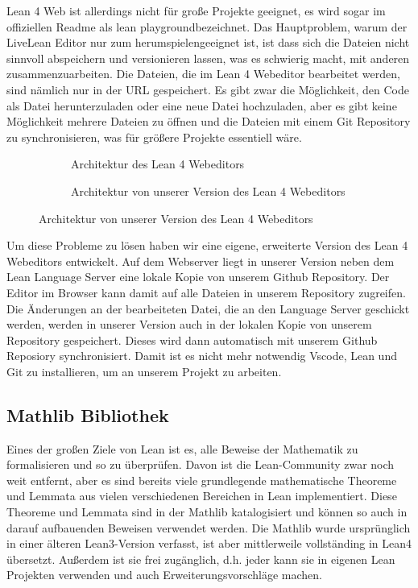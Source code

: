 \documentclass[10pt]{article}
\begin{document}
\noindent Lean 4 Web ist allerdings nicht für große Projekte geeignet, es wird sogar im offiziellen Readme als \glqq lean playground\grqq \space bezeichnet. Das Hauptproblem, warum der LiveLean Editor nur zum  \glqq herumspielen\grqq \space geeignet ist, ist dass sich die Dateien nicht sinnvoll abspeichern und versionieren lassen, was es schwierig macht, mit anderen zusammenzuarbeiten. Die Dateien, die im Lean 4 Webeditor bearbeitet werden, sind nämlich nur in der URL gespeichert. Es gibt zwar die Möglichkeit, den Code als Datei herunterzuladen oder eine neue Datei hochzuladen, aber es gibt keine Möglichkeit mehrere Dateien zu öffnen und die Dateien mit einem Git Repository zu synchronisieren, was für größere Projekte essentiell wäre. 
\begin{figure}[H]
\centering
    
\begin{subfigure}{.4\textwidth}
      \centering
    
    \caption{Architektur des Lean 4 Webeditors}
    \label{Architektur des Lean 4 Webeditors}
\end{subfigure}%
\begin{subfigure}{.6\textwidth}
      \centering
    
    \caption{Architektur von unserer Version des Lean 4 Webeditors}
    \label{Architektur des Lean 4 Webeditors}
\end{subfigure}
\end{figure}
\noindent Um diese Probleme zu lösen haben wir eine eigene, erweiterte Version des Lean 4 Webeditors entwickelt. Auf dem Webserver liegt in unserer Version neben dem Lean Language Server eine lokale Kopie von unserem Github Repository. Der Editor im Browser kann damit auf alle Dateien in unserem Repository zugreifen. Die Änderungen an der bearbeiteten Datei, die an den Language Server geschickt werden, werden in unserer Version auch in der lokalen Kopie von unserem Repository gespeichert. Dieses wird dann automatisch mit unserem Github Reposiory synchronisiert. Damit ist es nicht mehr notwendig Vscode, Lean und Git zu installieren, um an unserem Projekt zu arbeiten. 


\subsection{Mathlib Bibliothek}
Eines der großen Ziele von Lean ist es, alle Beweise der Mathematik zu formalisieren und so zu überprüfen. Davon ist die Lean-Community zwar noch weit entfernt, aber es sind bereits viele grundlegende mathematische Theoreme und Lemmata aus vielen verschiedenen Bereichen in Lean implementiert. Diese Theoreme und Lemmata sind in der Mathlib \cite{Q10} katalogisiert und können so auch in darauf aufbauenden Beweisen verwendet werden. Die Mathlib wurde ursprünglich in einer älteren Lean3-Version verfasst, ist aber mittlerweile vollständing in Lean4 übersetzt. Außerdem ist sie frei zugänglich, d.h. jeder kann sie in eigenen Lean Projekten verwenden und auch Erweiterungsvorschläge machen. 
\end{document}
